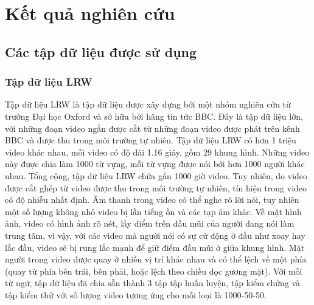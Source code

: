 \chapter{Kết quả nghiên cứu}

\section{Các tập dữ liệu được sử dụng}
\subsection{Tập dữ liệu LRW \cite{lrw}}

Tập dữ liệu LRW là tập dữ liệu được xây dựng bởi một nhóm nghiên cứu từ trường Đại học Oxford và sở hữu bởi hãng tin tức BBC. Đây là tập dữ liệu lớn, với những đoạn video ngắn được cắt từ những đoạn video được phát trên kênh BBC và được thu trong môi trường tự nhiên. Tập dữ liệu LRW có hơn 1 triệu video khác nhau, mỗi video có độ dài 1.16 giây, gồm 29 khung hình. Những video này được chia làm 1000 từ vựng, mỗi từ vựng được nói bởi hơn 1000 người khác nhau. Tổng cộng, tập dữ liệu LRW chứa gần 1000 giờ video. Tuy nhiên, do video được cắt ghép từ video được thu trong môi trường tự nhiên, tín hiệu trong video có độ nhiễu nhất định. Âm thanh trong video có thể nghe rõ lời nói, tuy nhiên một số lượng không nhỏ video bị lẫn tiếng ồn và các tạp âm khác. Về mặt hình ảnh, video có hình ảnh rõ nét, lấy điểm trên đầu mũi của người đang nói làm trung tâm, vì vậy, với các video mà người nói có sự cử động ở đầu như xoay hay lắc đầu, video sẽ bị rung lắc mạnh để giữ điểm đầu mũi ở giữa khung hình. Mặt người trong video được quay ở nhiều vị trí khác nhau và có thể lệch về một phía (quay từ phía bên trái, bên phải, hoặc lệch theo chiều dọc gương mặt). Với mỗi từ ngữ, tập dữ liệu đã chia sẵn thành 3 tập tập huấn luyện, tập kiểm chứng và tập kiểm thử với số lượng video tương ứng cho mỗi loại là 1000-50-50.

